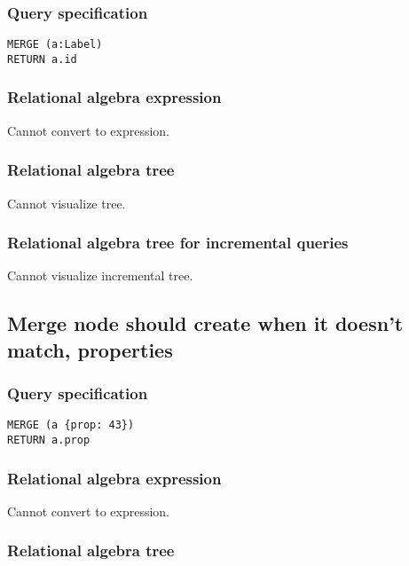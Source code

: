 \subsubsection*{Query specification}

\begin{lstlisting}
MERGE (a:Label)
RETURN a.id
\end{lstlisting}

\subsubsection*{Relational algebra expression}

Cannot convert to expression.

\subsubsection*{Relational algebra tree}

Cannot visualize tree.

\subsubsection*{Relational algebra tree for incremental queries}

Cannot visualize incremental tree.

\subsection{Merge node should create when it doesn't match, properties}

\subsubsection*{Query specification}

\begin{lstlisting}
MERGE (a {prop: 43})
RETURN a.prop
\end{lstlisting}

\subsubsection*{Relational algebra expression}

Cannot convert to expression.

\subsubsection*{Relational algebra tree}

